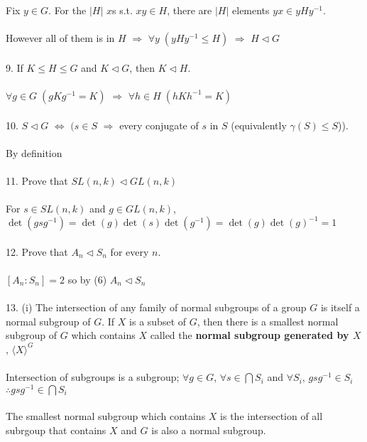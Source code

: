 \documentclass{article}
\begin{document}
\begin{siderules}
\null\qquad Fix \(y\in G\). For the \(|H|\) \(x\)s s.t. \(xy\in H\), there are \(|H|\) elements \(yx\in yHy^{-1}\).\\\\
\null\qquad However all of them is in \(H\) \(\Longrightarrow\) \(\forall y\;(yHy^{-1}\le H)\) \(\Longrightarrow\) \(H\vartriangleleft G\)\\\\
\color{blue}9. If \(K\le H\le G\) and \(K\vartriangleleft G\), then \(K\vartriangleleft H\).\\\\\color{black}
\null\qquad \(\forall g\in G\;(gKg^{-1}=K)\) \(\Longrightarrow\) \(\forall h \in H\;(hKh^{-1}=K)\)\\\\
\color{blue}10. \(S\vartriangleleft G\) \(\Longleftrightarrow\) \((s\in S\) \(\Longrightarrow\) every conjugate of \(s\) in \(S\) (equivalently \(\gamma(S)\le S\))).\color{black}\\\\
\null\qquad By definition\\\\
\color{blue}11. Prove that \(SL(n,k)\vartriangleleft GL(n,k)\)\color{black}\\\\
\null\qquad For \(s\in SL(n,k)\) and \(g\in GL(n,k)\), \(\det(gsg^{-1})=\det(g)\det(s)\det(g^{-1})=\det(g)\det(g)^{-1}=1\)\\\\
\color{blue}12. Prove that \(A_{n}\vartriangleleft S_{n}\) for every \(n\).\\\\\color{black}
\null\qquad \([A_{n}:S_{n}]=2\) so by \color{gray}(6)\color{black} \(A_{n}\vartriangleleft S_{n}\)\\\\
\color{blue}13. (i) The intersection of any family of normal subgroups of a group \(G\) is itself a normal subgroup of \(G\). If \(X\) is a subset of \(G\), then there is a 
smallest normal subgroup of \(G\) which contains \(X\) called the \textbf{normal subgroup generated by \(X\)}, \(\langle X\rangle^{G}\)\color{black}\\\\
\null\qquad Intersection of subgroups is a subgroup; \(\forall g\in G\), \(\forall s\in\bigcap S_{i}\) and \(\forall S_{i}\), \(gsg^{-1}\in S_{i}\) \(\therefore gsg^{-1}\in\bigcap S_{i}\)\\\\
\null\qquad The smallest normal subgroup which contains \(X\) is the intersection of all subrgoup that contains \(X\) and \(G\) is also a normal subgroup.\\\\

\end{siderules}
\end{document}
